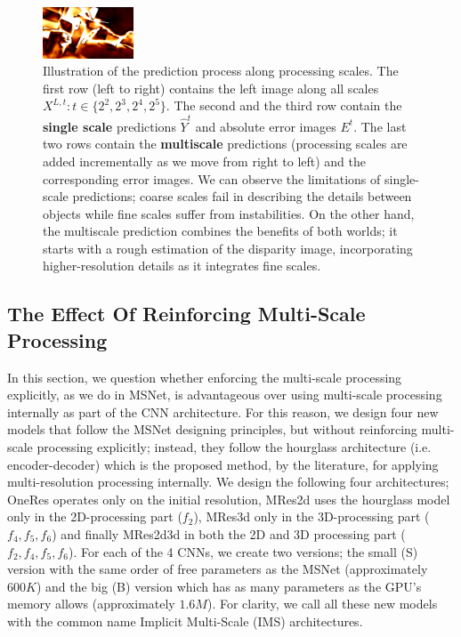 \documentclass[runningheads]{llncs}
\begin{document}
\begin{figure}
\begin{center}
        \includegraphics[width=0.24\textwidth,height=0.08\textwidth,clip]{figures/pred_comb_3_err.png}
    \end{center}
    \caption{Illustration of the prediction process along processing scales. The first row (left to right) contains the left image along all scales $X^{L,t} : t \in \{2^2, 2^3, 2^4, 2^5\}$. The second and the third row contain the \textbf{single scale} predictions $\hat{Y}^{t}$ and absolute error images $E^{t}$. The last two rows contain the \textbf{multiscale} predictions (processing scales are added incrementally as we move from right to left) and the corresponding error images. We can observe the limitations of single-scale predictions; coarse scales fail in describing the details between objects while fine scales suffer from instabilities. On the other hand, the multiscale prediction combines the benefits of both worlds; it starts with a rough estimation of the disparity image, incorporating higher-resolution details as it integrates fine scales.}
    \label{fig:EMAPs}
\end{figure}

\subsection{The Effect Of Reinforcing Multi-Scale Processing}

In this section, we question whether enforcing the multi-scale processing explicitly, as we do in MSNet, is advantageous over using multi-scale processing internally as part of the CNN architecture. For this reason, we design four new models that follow the MSNet designing principles, but without reinforcing multi-scale processing explicitly; instead, they follow the hourglass architecture (i.e. encoder-decoder) which is the proposed method, by the literature, for applying multi-resolution processing internally. We design the following four architectures; OneRes operates only on the initial resolution, MRes2d uses the hourglass model only in the 2D-processing part ($f_2$), MRes3d only in the 3D-processing part ($f_4, f_5, f_6$) and finally MRes2d3d in both the 2D and 3D processing part ($f_2, f_4, f_5, f_6$). For each of the 4 CNNs, we create two versions; the small (S) version with the same order of free parameters as the MSNet (approximately $600K$) and the big (B) version which has as many parameters as the GPU's memory allows (approximately $1.6M$). For clarity, we call all these new models with the common name Implicit Multi-Scale (IMS) architectures.
\end{document}
